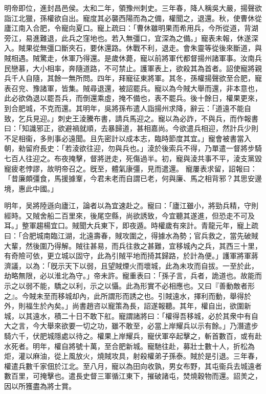 \begin{pinyinscope}
 
明帝即位，進封昌邑侯。太和二年，領豫州刺史。三年春，降人稱吳大嚴，揚聲欲詣江北獵，孫權欲自出。寵度其必襲西陽而為之備，權聞之，退還。秋，使曹休從廬江南入合肥，令寵向夏口。寵上疏曰：「曹休雖明果而希用兵，今所從道，背湖旁江，易進難退，此兵之窪地也。若入無彊口，宜深為之備。」寵表未報，休遂深入。賊果從無彊口斷夾石，要休還路。休戰不利，退走。會朱靈等從後來斷道，與賊相遇。賊驚走，休軍乃得還。是歲休薨，寵以前將軍代都督揚州諸軍事。汝南兵民戀慕，大小相率，奔隨道路，不可禁止。護軍表上，欲殺其為首者。詔使寵將親兵千人自隨，其餘一無所問。四年，拜寵征東將軍。其冬，孫權揚聲欲至合肥，寵表召兖、豫諸軍，皆集。賊尋退還，被詔罷兵。寵以為今賊大舉而還，非本意也，此必欲偽退以罷吾兵，而倒還乘虛，掩不備也，表不罷兵。後十餘日，權果更來，到合肥城，不克而還。其明年，吳將孫布遣人詣揚州求降，辭云：「道遠不能自致，乞兵見迎。」刺史王淩騰布書，請兵馬迎之。寵以為必詐，不與兵，而作報書曰：「知識邪正，欲避禍就順，去暴歸道，甚相嘉尚。今欲遣兵相迎，然計兵少則不足相衞，多則事必遠聞。且先密計以成本志，臨時節度其宜。」寵會被書當入朝，勑留府長史：「若淩欲往迎，勿與兵也。」淩於後索兵不得，乃單遣一督將步騎七百人往迎之。布夜掩擊，督將迸走，死傷過半。初，寵與淩共事不平，淩支黨毀寵疲老悖謬，故明帝召之。旣至，體氣康彊，見而遣還。
 寵屢表求留，詔報曰：「昔廉頗彊食，馬援據鞌，今君未老而自謂已老，何與廉、馬之相背邪？其思安邊境，惠此中國。」
 
 
 
 
 明年，吴將陸遜向廬江，論者以為宜速赴之。寵曰：「廬江雖小，將勁兵精，守則經時。又賊舍船二百里來，後尾空縣，尚欲誘致，今宜聽其遂進，但恐走不可及耳。」整軍趨楊宜口。賊聞大兵東下，即夜遁。時權歲有來計。青龍元年，寵上疏曰：「合肥城南臨江湖，北遠壽春，賊攻圍之，得據水為勢；官兵救之，當先破賊大輩，然後圍乃得解。賊往甚易，而兵往救之甚難，宜移城內之兵，其西三十里，有奇險可依，更立城以固守，此為引賊平地而掎其歸路，於計為便。」護軍將軍蔣濟議，以為：「旣示天下以弱，且望賊煙火而壞城，此為未攻而自拔。一至於此，劫略無限，必以淮北為守。」帝未許。寵重表曰：「孫子言，兵者，詭道也。故能而示之以弱不能，驕之以利，示之以懾。此為形實不必相應也。又曰『善動敵者形之』。今賊未至而移城却內，此所謂形而誘之也。引賊遠水，擇利而動，舉得於外，則福生於內矣。」尚書趙咨以寵策為長，詔遂報聽。其年，權自出，欲圍新城，以其遠水，積二十日不敢下舡。寵謂諸將曰：「權得吾移城，必於其衆中有自大之言，今大舉來欲要一切之功，雖不敢至，必當上岸耀兵以示有餘。」乃潛遣步騎六千，伏肥城隱處以待之。權果上岸耀兵，寵伏軍卒起擊之，斬首數百，或有赴水死者。明年，權自將號十萬，至合肥新城。寵馳往赴，募壯士數十人，折松為炬，灌以麻油，從上風放火，燒賊攻具，射殺權弟子孫泰。賊於是引退。三年春，權遣兵數千家佃於江北。至八月，寵以為田向收孰，男女布野，其屯衞兵去城遠者數百里，可掩擊也。遣長史督三軍循江東下，摧破諸屯，焚燒穀物而還。詔羙之，因以所獲盡為將士賞。
 

\end{pinyinscope}
